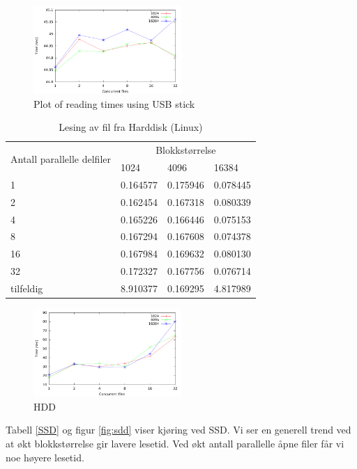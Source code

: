 \documentclass[titlepage]{article}
\begin{document}
\begin{figure}[h!]
  \caption{Plot of reading times using USB stick}
  \label{fig:usb}
  \centering
  \includegraphics[width=0.5\textwidth]{res/result-usb}
\end{figure}

\begin{table}[h!]
\caption{Lesing av fil fra Harddisk (Linux)}
\label{HDD}
\centering
\begin{tabular}{|l|l|l|l|}
\hline
\multirow{2}{*}{ Antall parallelle delfiler} & \multicolumn{3}{|c|}{Blokkstørrelse} \\
 & 1024 & 4096 & 16384\\
\hline
1         &  0.164577 &  0.175946 & 0.078445 \\
2         &  0.162454 &  0.167318 & 0.080339 \\
4         &  0.165226 &  0.166446 & 0.075153 \\
8         &  0.167294 &  0.167608 & 0.074378 \\
16        &  0.167984 &  0.169632 & 0.080130 \\
32        &  0.172327 &  0.167756 & 0.076714 \\
tilfeldig &  8.910377 &  0.169295 & 4.817989 \\
\hline
\end{tabular}
\end{table}

\begin{figure}[h!]
  \caption{HDD}
  \label{fig:hdd}
  \centering
  \includegraphics[width=0.5\textwidth]{res/result-hdd}
\end{figure}

Tabell \ref{SSD} og figur \ref{fig:sdd} viser kjøring ved SSD. Vi ser
en generell trend ved at økt blokkstørrelse gir lavere lesetid. Ved
økt antall parallelle åpne filer får vi noe høyere lesetid.
\end{document}
